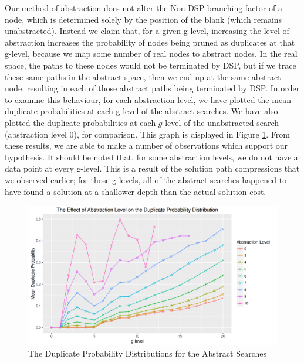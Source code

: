\documentclass{article}
\begin{document}
Our method of abstraction does not alter the Non-DSP branching factor of a node, which is determined solely by the
position of the blank (which remains unabstracted). Instead we claim that, for a given g-level,
increasing the level of abstraction increases the probability of nodes being
pruned as duplicates at that g-level, because we map some number of real nodes to abstract nodes.
In the real space, the paths to these nodes would not be terminated by DSP,
but if we trace these same paths in the abstract space, then we end up at the same abstract node,
resulting in each of those abstract paths being terminated by DSP.
In order to examine this behaviour,
for each abstraction level, we have plotted the mean duplicate probabilities at each g-level of
the abstract searches.
We have also plotted the duplicate probabilities at each \(g\)-level of the unabstracted search (abstraction level 0),
for comparison.
This graph is displayed in Figure \ref{fig:adpd}.
From these results, we are able to make a number of observations which support our hypothesis.
It should be noted that, for some abstraction levels,
we do not have a data point at every g-level.
This is a result of the solution path compressions that we observed earlier;
for those g-levels, all of the abstract searches happened to have found a solution at a shallower depth than the
actual solution cost. \\

\begin{figure}
  \centering
  \includegraphics[width=1\textwidth]{g-level_vs_duplicates_plot}
  \caption{The Duplicate Probability Distributions for the Abstract Searches}
  \label{fig:adpd}
\end{figure}
\end{document}
